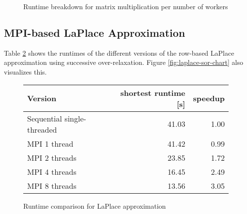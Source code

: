 \documentclass[]{article}
\begin{document}
\begin{figure}[h]
	\centering
	\caption{Runtime breakdown for matrix multiplication per number of workers}
	\label{fig:maxtrix-mult-chart}
\end{figure}

\subsection{MPI-based LaPlace Approximation}

 Table \ref{tab:laplace-sor-runtime} shows the runtimes of the different versions of the row-based LaPlace approximation using successive over-relaxation. Figure \ref{fig:laplace-sor-chart} also visualizes this.

\begin{figure}[h]
	\centering
	\begin{tabular}{|l|r|r|}
		\hline
		\textbf{Version} & \textbf{shortest runtime [s]} & \textbf{speedup} \\
		\hline
		Sequential single-threaded	& 41.03 & 1.00 \\ 
		\hline 
		MPI 1 thread				& 41.42 & 0.99 \\ 
		\hline 
		MPI 2 threads				& 23.85 & 1.72 \\ 
		\hline 
		MPI 4 threads 				& 16.45 & 2.49 \\ 
		\hline 
		MPI 8 threads				& 13.56 & 3.05 \\ 
		\hline 
	\end{tabular} 
	\caption{Runtime comparison for LaPlace approximation}
	\label{tab:laplace-sor-runtime}
\end{figure}
\end{document}
